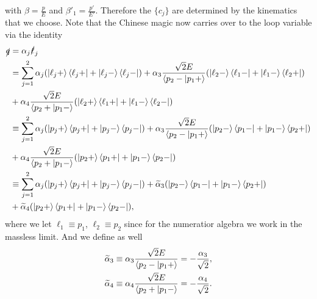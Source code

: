 with $\beta=\frac{p}{E}$ and $\beta'_1=\frac{p'}{E'}$. Therefore the $\{c_j\}$ are determined by the kinematics that we choose. Note that the Chinese magic now carries over to the loop variable via the identity
\begin{align}
\slashed q&=\alpha_j\slashed \ell_j\nonumber\\
&=\sum_{j=1}^{2}\alpha_j(\ket{\ell_j+}\bra{\ell_j+}+\ket{\ell_j-}\bra{\ell_j-})+\alpha_3\frac{\sqrt{2}E}{\braket{p_2-|p_1+}}(\ket{\ell_2-}\bra{\ell_1-}+\ket{\ell_1-}\bra{\ell_2+})\nonumber\\
&+\alpha_4\frac{\sqrt{2}E}{\braket{p_2+|p_1-}}(\ket{\ell_2+}\bra{\ell_1+}+\ket{\ell_1-}\bra{\ell_2-})\nonumber\\
&\equiv\sum_{j=1}^{2}\alpha_j(\ket{p_j+}\bra{p_j+}+\ket{p_j-}\bra{p_j-})+\alpha_3\frac{\sqrt{2}E}{\braket{p_2-|p_1+}}(\ket{p_2-}\bra{p_1-}+\ket{p_1-}\bra{p_2+})\nonumber\\
&+\alpha_4\frac{\sqrt{2}E}{\braket{p_2+|p_1-}}(\ket{p_2+}\bra{p_1+}+\ket{p_1-}\bra{p_2-})\nonumber\\
&\equiv\sum_{j=1}^{2}\alpha_j(\ket{p_j+}\bra{p_j+}+\ket{p_j-}\bra{p_j-})+\widetilde{\alpha}_3(\ket{p_2-}\bra{p_1-}+\ket{p_1-}\bra{p_2+})\nonumber\\
&+\widetilde{\alpha}_4(\ket{p_2+}\bra{p_1+}+\ket{p_1-}\bra{p_2-}),
\end{align}
where we let $\ell_1\equiv p_1$, $\ell_2\equiv p_2$ since for the numeratior algebra we work in the massless limit. And we define as well
\begin{align}
\widetilde{\alpha}_3&\equiv\alpha_3\frac{\sqrt{2}E}{\braket{p_2-|p_1+}}=-\frac{\alpha_3}{\sqrt{2}},\nonumber\\
\widetilde{\alpha}_4&\equiv\alpha_4\frac{\sqrt{2}E}{\braket{p_2+|p_1-}}=-\frac{\alpha_4}{\sqrt{2}}.
\end{align}


